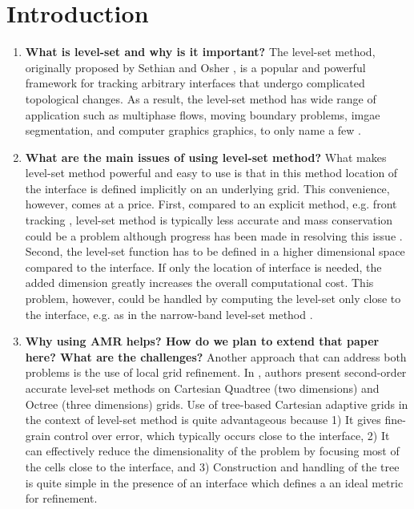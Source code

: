 \section{Introduction}
\begin{enumerate}
\item \textbf{What is level-set and why is it important?}
The level-set method, originally proposed by Sethian and Osher , is a popular and powerful framework for tracking arbitrary interfaces that undergo complicated topological changes. As a result, the level-set method has wide range of application such as multiphase flows, moving boundary problems, imgae segmentation, and computer graphics graphics, to only name a few .

\item \textbf{What are the main issues of using level-set method?}
What makes level-set method powerful and easy to use is that in this method location of the interface is defined implicitly on an underlying grid. This convenience, however, comes at a price. First, compared to an explicit method, e.g. front tracking , level-set method is typically less accurate and mass conservation could be a problem although progress has been made in resolving this issue . Second, the level-set function has to be defined in a higher dimensional space compared to the interface. If only the location of interface is needed, the added dimension greatly increases the overall computational cost. This problem, however, could be handled by computing the level-set only close to the interface, e.g. as in the narrow-band level-set method .

\item \textbf{Why using AMR helps? How do we plan to extend that paper here? What are the challenges?}
Another approach that can address both problems is the use of local grid refinement. In , authors present second-order accurate level-set methods on Cartesian Quadtree (two dimensions) and Octree (three dimensions) grids. Use of tree-based Cartesian adaptive grids in the context of level-set method is quite advantageous because 1) It gives fine-grain control over error, which typically occurs close to the interface, 2) It can effectively reduce the dimensionality of the problem by focusing most of the cells close to the interface, and 3) Construction and handling of the tree is quite simple in the presence of an interface which defines a an ideal metric for refinement.


\end{enumerate}
